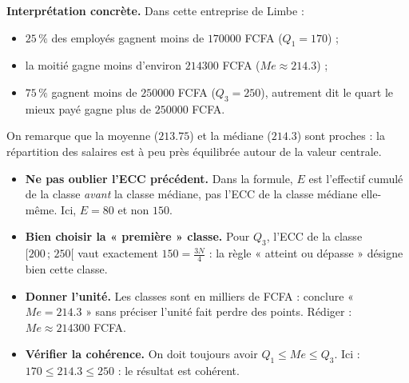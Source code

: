 \documentclass[11pt]{article}
\begin{document}
\begin{exoresolu}
\textbf{Interprétation concrète.} Dans cette entreprise de Limbe :
\begin{itemize}
\item $25\,\%$ des employés gagnent moins de $\num{170000}$ FCFA ($Q_1 = 170$) ;
\item la moitié gagne moins d'environ $\num{214300}$ FCFA ($Me \approx \num{214,3}$) ;
\item $75\,\%$ gagnent moins de $\num{250000}$ FCFA ($Q_3 = 250$), autrement dit le quart le mieux payé gagne plus de $\num{250000}$ FCFA.
\end{itemize}
On remarque que la moyenne ($\num{213,75}$) et la médiane ($\num{214,3}$) sont proches : la répartition des salaires est à peu près équilibrée autour de la valeur centrale.
\end{exoresolu}

\begin{attention}
\begin{itemize}
\item \textbf{Ne pas oublier l'ECC précédent.} Dans la formule, $E$ est l'effectif cumulé de la classe \emph{avant} la classe médiane, pas l'ECC de la classe médiane elle-même. Ici, $E = 80$ et non $150$.
\item \textbf{Bien choisir la « première » classe.} Pour $Q_3$, l'ECC de la classe $[200\,;\,250[$ vaut exactement $150 = \frac{3N}{4}$ : la règle « atteint ou dépasse » désigne bien cette classe.
\item \textbf{Donner l'unité.} Les classes sont en milliers de FCFA : conclure « $Me = \num{214,3}$ » sans préciser l'unité fait perdre des points. Rédiger : $Me \approx \num{214300}$ FCFA.
\item \textbf{Vérifier la cohérence.} On doit toujours avoir $Q_1 \leq Me \leq Q_3$. Ici : $170 \leq \num{214,3} \leq 250$ : le résultat est cohérent.
\end{itemize}
\end{attention}
\end{document}
